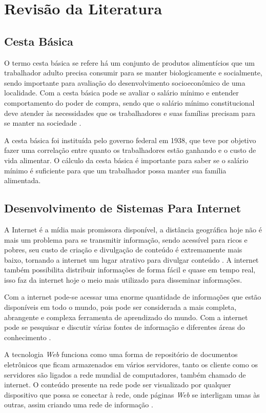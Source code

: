 \documentclass{ifto-tex}
\begin{document}
\chapter{Revisão da Literatura}
	
	\section{Cesta Básica}
O termo cesta básica se refere há um conjunto de produtos alimentícios que um trabalhador adulto precisa consumir para se manter biologicamente e socialmente, sendo importante para avaliação do desenvolvimento socioeconômico de uma localidade. Com a cesta básica pode se avaliar o salário mínimo e entender comportamento do poder de compra, sendo que o salário mínimo constitucional deve atender às necessidades que os trabalhadores e suas famílias precisam para se manter na sociedade \cite{araujo2007impacto}.

A cesta básica foi instituída pelo governo federal em 1938, que teve por objetivo fazer uma correlação entre quanto os trabalhadores estão ganhando e o custo de vida alimentar. O cálculo da cesta básica é importante para saber se o salário mínimo é suficiente para que um trabalhador possa manter sua família alimentada.

\section{Desenvolvimento de Sistemas Para Internet}
A Internet é a mídia mais promissora disponível, a distância geográfica hoje não é mais um problema para se transmitir informação, sendo acessível para ricos e pobres, seu custo de criação e divulgação de conteúdo é extremamente mais baixo, tornando a internet um lugar atrativo para divulgar conteúdo \cite{moran1997utilizar}. A internet também possibilita distribuir informações de forma fácil e quase em tempo real, isso faz da internet hoje o meio mais utilizado para disseminar informações.

Com a internet pode-se acessar uma enorme quantidade de informações que estão disponíveis em todo o mundo, pois pode ser considerada a mais completa, abrangente e complexa ferramenta de aprendizado do mundo. Com a internet pode se pesquisar e discutir várias fontes de informação e diferentes áreas do conhecimento \cite{garcia2002internet}.

A tecnologia \textit{Web} funciona como uma forma de repositório de documentos eletrônicos que ficam armazenados em vários servidores, tanto os cliente como os servidores são ligados a rede mundial de computadores, também chamado de internet. O conteúdo presente na rede pode ser visualizado por qualquer dispositivo que possa se conectar à rede, onde páginas \textit{Web} se interligam umas às outras, assim criando uma rede de informação \cite{junior2009sistemas}.
\end{document}
